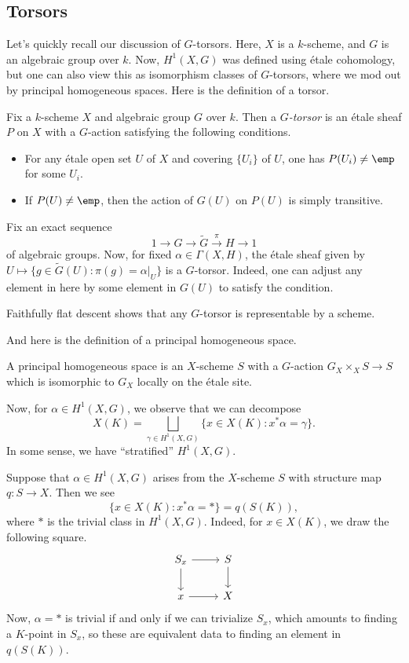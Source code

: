 \documentclass[../notes.tex]{subfiles}
\begin{document}
\subsection{Torsors}
Let's quickly recall our discussion of $G$-torsors. Here, $X$ is a $k$-scheme, and $G$ is an algebraic group over $k$. Now, $H^1(X,G)$ was defined using \'etale cohomology, but one can also view this as isomorphism classes of $G$-torsors, where we mod out by principal homogeneous spaces. Here is the definition of a torsor.
\begin{definition}[torsor]
	Fix a $k$-scheme $X$ and algebraic group $G$ over $k$. Then a \textit{$G$-torsor} is an \'etale sheaf $P$ on $X$ with a $G$-action satisfying the following conditions.
	\begin{itemize}
		\item For any \'etale open set $U$ of $X$ and covering $\{U_i\}$ of $U$, one has $P(U_i)\ne\emp$ for some $U_i$.
		\item If $P(U)\ne\emp$, then the action of $G(U)$ on $P(U)$ is simply transitive.
	\end{itemize}
\end{definition}
\begin{example}
	Fix an exact sequence
	\[1\to G\to\widetilde G\stackrel\pi\to H\to1\]
	of algebraic groups. Now, for fixed $\alpha\in\Gamma(X,H)$, the \'etale sheaf given by $U\mapsto\{g\in\widetilde G(U):\pi(g)=\alpha|_U\}$ is a $G$-torsor. Indeed, one can adjust any element in here by some element in $G(U)$ to satisfy the condition.
\end{example}
\begin{remark}
	Faithfully flat descent shows that any $G$-torsor is representable by a scheme.
\end{remark}
And here is the definition of a principal homogeneous space.
\begin{definition}
	A  principal homogeneous space is an $X$-scheme $S$ with a $G$-action $G_X\times_XS\to S$ which is isomorphic to $G_X$ locally on the \'etale site.
\end{definition}
Now, for $\alpha\in H^1(X,G)$, we observe that we can decompose
\[X(K)=\bigsqcup_{\gamma\in H^1(X,G)}\{x\in X(K):x^*\alpha=\gamma\}.\]
In some sense, we have ``stratified'' $H^1(X,G)$.
\begin{example}
	Suppose that $\alpha\in H^1(X,G)$ arises from the $X$-scheme $S$ with structure map $q\colon S\to X$. Then we see
	\[\{x\in X(K):x^*\alpha=*\}=q(S(K)),\]
	where $*$ is the trivial class in $H^1(X,G)$. Indeed, for $x\in X(K)$, we draw the following square.
	\[\begin{tikzcd}
		{S_x} & S \\
		x & X
		\arrow[from=1-1, to=1-2]
		\arrow[from=1-2, to=2-2]
		\arrow[from=2-1, to=2-2]
		\arrow[from=1-1, to=2-1]
	\end{tikzcd}\]
	Now, $\alpha=*$ is trivial if and only if we can trivialize $S_x$, which amounts to finding a $K$-point in $S_x$, so these are equivalent data to finding an element in $q(S(K))$.
\end{example}
\end{document}
